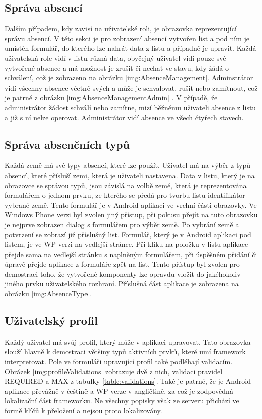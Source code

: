 \subsection{Správa absencí}
Dalším případem, kdy zavisí na uživatelské roli, je obrazovka reprezentující správu absencí. V této sekci je pro zobrazení absencí vytvořen list a pod ním je umístěn formulář, do kterého lze nahrát data z listu a případně je upravit. Každá uživatelská role vidí v listu různá data, obyčejný uživatel vidí pouze své vytvořené absence a má možnost je zrušit či nechat ve stavu, kdy žádá o schválení, což je zobrazeno na obrázku \ref{img:AbsenceManagement}. Adminstrátor vidí všechny absence včetně svých a může je schvalovat, rušit nebo zamítnout, což je patrné z obrázku \ref{img:AbsenceManagementAdmin} . V případě, že administrátor žádost schválí nebo zamítne, mizí běžnému uživateli absence z listu a již s ní nelze operovat. Administrátor vidí absence ve všech čtyřech stavech. 

\subsection{Správa absenčních typů}
Každá země má své typy absencí, které lze použít. Uživatel má na výběr z typů absencí, které přísluší zemi, která je uživateli nastavena. Data v listu, který je na obrazovce se správou typů, jsou závislá na volbě země, která je reprezentována formulářem o jednom prvku, ze kterého se předá pro tvorbu listu identifikátor vybrané země. Tento formulář je v Android aplikaci ve vrchní části obrazovky. Ve Windows Phone verzi byl zvolen jiný přístup, při pokusu přejít na tuto obrazovku je nejprve zobrazen dialog s formulářem pro výběr země. Po vybrání země a potvrzení se zobrazí již příslušný list. Formulář, který je v Android aplikaci pod listem, je ve WP verzi na vedlejší stránce. Při kliku na položku v listu aplikace přejde sama na vedlejší stránku s naplněným formulářem, při úspěšném přidání či úpravě přejde aplikace z formuláře zpět na list. Tento přístup byl zvolen pro demostraci toho, že vytvořené komponenty lze opravdu vložit do jakéhokoliv jiného prvku uživatelského rozhraní. Příslušná část aplikace je zobrazena na obrázku \ref{img:AbsenceType}.

\subsection{Uživatelský profil}
Každý uživatel má svůj profil, který může v aplikaci upravovat. Tato obrazovka slouží hlavně k demostraci většiny typů aktivních prvků, které umí framework interpretovat. Pole ve formuláři upravující profil také podléhají validacím. Obrázek \ref{img:profileValidations} zobrazuje dvě z nich, validaci pravidel REQUIRED a MAX z tabulky \ref{table:validations}. Také je patrné, že je Android aplikace převážně v češtině a WP verze v angličtině, za což je zodpovědná lokalizační část frameworku. Ne všechny popisky však ze serveru přichází ve formě klíčů k přeložení a nejsou proto lokalizovány. 
